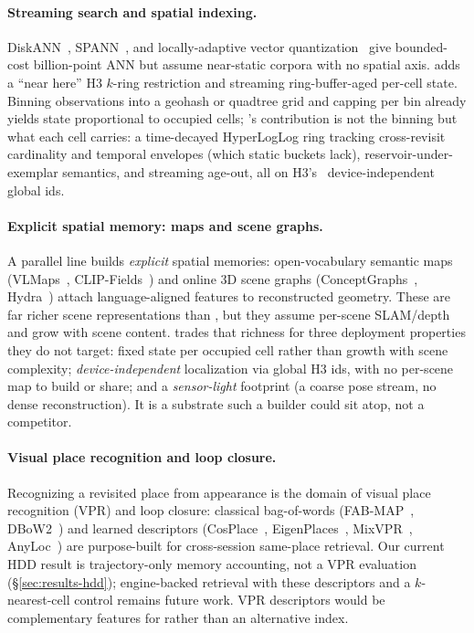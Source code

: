 \paragraph{Streaming search and spatial indexing.}
DiskANN~\cite{jayaram2019diskann}, SPANN~\cite{chen2021spann}, and
locally-adaptive vector quantization~\cite{aguerrebere2024lvq} give
bounded-cost billion-point ANN but assume near-static corpora with no spatial
axis. \psm{} adds a ``near here'' H3 $k$-ring restriction and streaming
ring-buffer-aged per-cell state. Binning observations into a geohash or quadtree
grid and capping per bin already yields state proportional to occupied cells; \psm{}'s
contribution is not the binning but what each cell carries: a time-decayed
HyperLogLog ring tracking cross-revisit cardinality and temporal envelopes (which
static buckets lack), reservoir-under-\caponek{} exemplar semantics, and streaming
age-out, all on H3's~\cite{brodsky2018h3} device-independent global ids.

\paragraph{Explicit spatial memory: maps and scene graphs.}
A parallel line builds \emph{explicit} spatial memories: open-vocabulary
semantic maps (VLMaps~\cite{huang2023vlmaps},
CLIP-Fields~\cite{shafiullah2023clipfields}) and online 3D scene graphs
(ConceptGraphs~\cite{gu2024conceptgraphs}, Hydra~\cite{hughes2022hydra}) attach
language-aligned features to reconstructed geometry. These are far richer scene
representations than \psm{}, but they assume per-scene SLAM/depth and grow with
scene content. \psm{} trades that richness for three deployment properties they
do not target: fixed state per occupied cell rather than growth with scene
complexity; \emph{device-independent} localization via global H3 ids, with no
per-scene map to build or share; and a \emph{sensor-light} footprint (a coarse
pose stream, no dense reconstruction). It is a substrate such a builder could
sit atop, not a competitor.

\paragraph{Visual place recognition and loop closure.}
Recognizing a revisited place from appearance is the domain of visual place
recognition (VPR) and loop closure: classical bag-of-words
(FAB-MAP~\cite{cummins2008fabmap}, DBoW2~\cite{galvezlopez2012dbow2}) and learned
descriptors (CosPlace~\cite{berton2022cosplace},
EigenPlaces~\cite{berton2023eigenplaces}, MixVPR~\cite{alibey2023mixvpr},
AnyLoc~\cite{keetha2023anyloc}) are purpose-built for cross-session same-place
retrieval. Our current HDD result is trajectory-only memory accounting, not a VPR
evaluation (\S\ref{sec:results-hdd}); engine-backed retrieval with these
descriptors and a $k$-nearest-cell control remains future work. VPR descriptors
would be complementary features for \psm{} rather than an alternative index.
